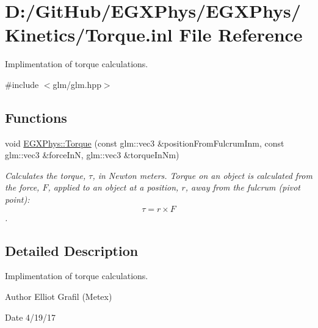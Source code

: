 \hypertarget{_torque_8inl}{}\section{D\+:/\+Git\+Hub/\+E\+G\+X\+Phys/\+E\+G\+X\+Phys/\+Kinetics/\+Torque.inl File Reference}
\label{_torque_8inl}


Implimentation of torque calculations.  


{\ttfamily \#include $<$glm/glm.\+hpp$>$}\newline
\subsection*{Functions}
\begin{DoxyCompactItemize}
\item 
void \mbox{\hyperlink{group___e_g_x_phys-_kinetics-_torque_ga12a787853cab88d40412c8290ca41c61}{E\+G\+X\+Phys\+::\+Torque}} (const glm\+::vec3 \&position\+From\+Fulcrum\+Inm, const glm\+::vec3 \&force\+InN, glm\+::vec3 \&torque\+In\+Nm)
\begin{DoxyCompactList}\small\item\em Calculates the torque, $\tau$, in Newton meters. Torque on an object is calculated from the force, $F$, applied to an object at a position, $r$, away from the fulcrum (pivot point)\+: \[\tau=r \times F \]. \end{DoxyCompactList}\end{DoxyCompactItemize}


\subsection{Detailed Description}
Implimentation of torque calculations. 

\begin{DoxyAuthor}{Author}
Elliot Grafil (Metex) 
\end{DoxyAuthor}
\begin{DoxyDate}{Date}
4/19/17 
\end{DoxyDate}
